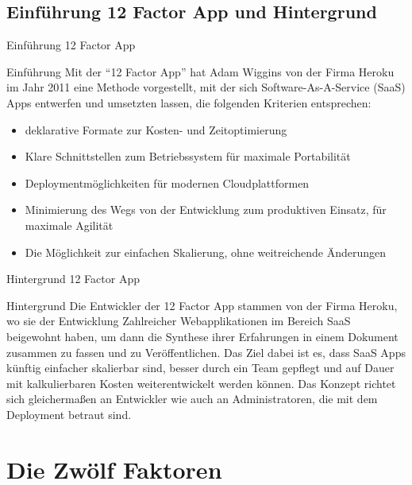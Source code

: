 \documentclass{beamer}
\begin{document}
			\subsection{Einführung 12 Factor App und Hintergrund}
				\begin{frame}{Einführung 12 Factor App}
					\begin{block}{Einführung}
						Mit der \enquote{12 Factor App} hat Adam Wiggins von der Firma Heroku im Jahr 2011 eine Methode vorgestellt, mit der sich Software-As-A-Service (SaaS) Apps entwerfen und umsetzten lassen, die folgenden Kriterien entsprechen:
						\begin{itemize}
							\item deklarative Formate zur Kosten- und Zeitoptimierung
							\item Klare Schnittstellen zum Betriebssystem für maximale Portabilität
							\item Deploymentmöglichkeiten für modernen Cloudplattformen
							\item Minimierung des Wegs von der Entwicklung zum produktiven Einsatz, für maximale Agilität
							\item Die Möglichkeit zur einfachen Skalierung, ohne weitreichende Änderungen
						\end{itemize}
					\end{block}
				\end{frame}
				\begin{frame}{Hintergrund 12 Factor App}
					\begin{block}{Hintergrund}
						Die Entwickler der 12 Factor App stammen von der Firma Heroku, wo sie der Entwicklung Zahlreicher Webapplikationen im Bereich SaaS beigewohnt haben, um dann die Synthese ihrer Erfahrungen in einem Dokument zusammen zu fassen und zu Veröffentlichen.\newline
						Das Ziel dabei ist es, dass SaaS Apps künftig einfacher skalierbar sind, besser durch ein Team gepflegt und auf Dauer mit kalkulierbaren Kosten weiterentwickelt werden können. Das Konzept richtet sich gleichermaßen an Entwickler wie auch an Administratoren, die mit dem Deployment betraut sind.
					\end{block}
				\end{frame}
		\section{Die Zwölf Faktoren}
\end{document}
